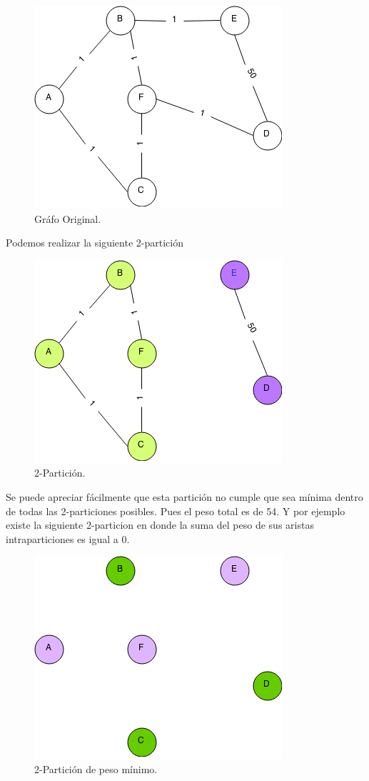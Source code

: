 \begin{figure}[H]
\begin{center}
\includegraphics[scale=0.7]{img/kpmp.png}
\caption{Gr\'afo Original.}
\end{center}
\end{figure}

Podemos realizar la siguiente 2-partici\'on 

\begin{figure}[H]
\begin{center}
\includegraphics[scale=0.7]{img/kpmp1.png}
\caption{2-Partici\'on.}
\end{center}
\end{figure}


Se puede apreciar f\'acilmente que esta partici\'on no cumple que sea m\'inima dentro de todas las 2-particiones posibles. Pues el peso total es de 54. Y por ejemplo existe la siguiente 2-particion en donde la suma del peso de sus aristas intraparticiones es igual a 0.

\begin{figure}[H]
\begin{center}
\includegraphics[scale=0.7]{img/kpmp2.png}
\caption{2-Partici\'on de peso m\'inimo.}
\end{center}
\end{figure}